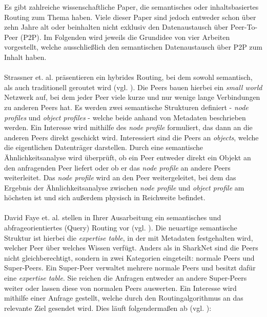 Es gibt zahlreiche wissenschaftliche Paper, die semantisches oder inhaltsbasiertes Routing zum Thema haben. Viele dieser Paper sind jedoch entweder schon über zehn Jahre alt oder beinhalten nicht exklusiv den Datenaustausch über Peer-To-Peer (P2P). Im Folgenden wird jeweils die Grundidee von vier Arbeiten vorgestellt, welche ausschließlich den semantischen Datenaustausch über P2P zum Inhalt haben.\\\\
Strassner et. al. präsentieren ein hybrides Routing, bei dem sowohl semantisch, als auch traditionell geroutet wird (vgl. \citet[S. 164ff]{Strassner2010}). Die Peers bauen hierbei ein \textit{small world} Netzwerk auf, bei dem jeder Peer viele kurze und nur wenige lange Verbindungen zu anderen Peers hat. Es werden zwei semantische Strukturen definiert - \textit{node profiles} und \textit{object profiles} - welche beide anhand von Metadaten beschrieben werden. Ein Interesse wird mithilfe des \textit{node profile} formuliert, das dann an die anderen Peers direkt geschickt wird. Interessiert sind die Peers an \textit{objects}, welche die eigentlichen Datenträger darstellen. Durch eine semantische Ähnlichkeitsanalyse wird überprüft, ob ein Peer entweder direkt ein Objekt an den anfragenden Peer liefert oder ob er das \textit{node profile} an andere Peers weiterleitet. Das \textit{node profile} wird an den Peer weitergeleitet, bei dem das Ergebnis der Ähnlichkeitsanalyse zwischen \textit{node profile} und \textit{object profile} am höchsten ist und sich außerdem physisch in Reichweite befindet. \\\\
David Faye et. al. stellen in Ihrer Ausarbeitung ein semantisches und abfrageorientiertes (Query) Routing vor (vgl. \citet[S. 365f]{Faye2007}). Die neuartige semantische Struktur ist hierbei die \textit{expertise table}, in der mit Metadaten festgehalten wird, welcher Peer über welches Wissen verfügt. Anders als in SharkNet sind die Peers nicht gleichberechtigt, sondern in zwei Kategorien eingeteilt: normale Peers und Super-Peers. Ein Super-Peer verwaltet mehrere normale Peers und besitzt dafür eine \textit{expertise table}. Sie reichen die Anfragen entweder an andere Super-Peers weiter oder lassen diese von normalen Peers auswerten. Ein Interesse wird mithilfe einer Anfrage gestellt, welche durch den Routingalgorithmus an das relevante Ziel gesendet wird. Dies läuft folgendermaßen ab (vgl. \citet[S. 370f]{Faye2007}):
